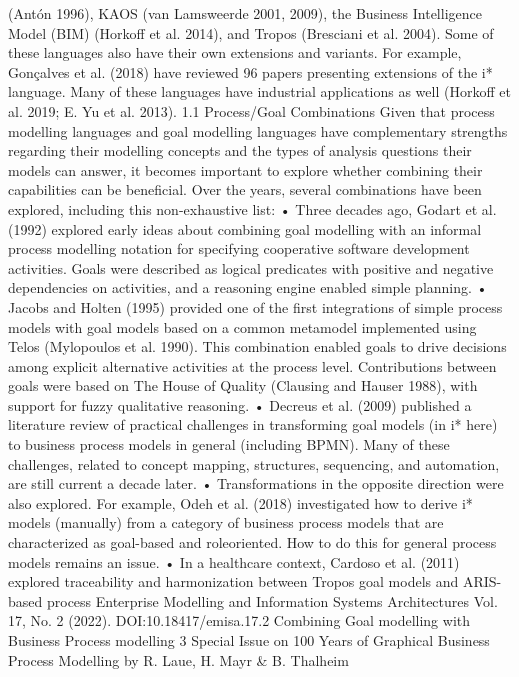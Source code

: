 (Antón 1996), KAOS (van Lamsweerde 2001,
2009), the Business Intelligence Model (BIM)
(Horkoff et al. 2014), and Tropos (Bresciani
et al. 2004). Some of these languages also have
their own extensions and variants. For example,
Gonçalves et al. (2018) have reviewed 96 papers
presenting extensions of the i* language. Many
of these languages have industrial applications as
well (Horkoff et al. 2019; E. Yu et al. 2013).
1.1 Process/Goal Combinations
Given that process modelling languages and
goal modelling languages have complementary
strengths regarding their modelling concepts and
the types of analysis questions their models can
answer, it becomes important to explore whether
combining their capabilities can be beneficial.
Over the years, several combinations have been
explored, including this non-exhaustive list:
• Three decades ago, Godart et al. (1992) explored early ideas about combining goal modelling with an informal process modelling notation for specifying cooperative software development activities. Goals were described as
logical predicates with positive and negative dependencies on activities, and a reasoning engine
enabled simple planning.
• Jacobs and Holten (1995) provided one of the
first integrations of simple process models with
goal models based on a common metamodel
implemented using Telos (Mylopoulos et al.
1990). This combination enabled goals to drive
decisions among explicit alternative activities
at the process level. Contributions between
goals were based on The House of Quality
(Clausing and Hauser 1988), with support for
fuzzy qualitative reasoning.
• Decreus et al. (2009) published a literature
review of practical challenges in transforming
goal models (in i* here) to business process
models in general (including BPMN). Many of
these challenges, related to concept mapping,
structures, sequencing, and automation, are still
current a decade later.
• Transformations in the opposite direction were
also explored. For example, Odeh et al. (2018)
investigated how to derive i* models (manually)
from a category of business process models
that are characterized as goal-based and roleoriented. How to do this for general process
models remains an issue.
• In a healthcare context, Cardoso et al. (2011) explored traceability and harmonization between
Tropos goal models and ARIS-based process
Enterprise Modelling and Information Systems Architectures
Vol. 17, No. 2 (2022). DOI:10.18417/emisa.17.2
Combining Goal modelling with Business Process modelling 3
Special Issue on 100 Years of Graphical Business Process Modelling by R. Laue, H. Mayr & B. Thalheim
